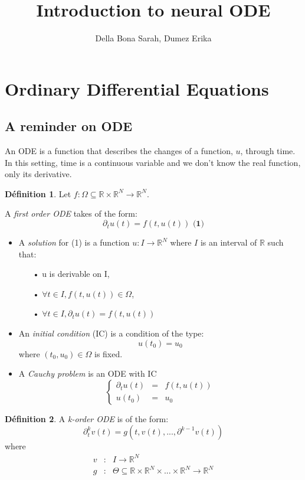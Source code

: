 \documentclass[10pt,a4paper]{article}
\author{Della Bona Sarah, Dumez Erika}
\title{Introduction to neural ODE}
\theoremstyle{definition}
\newtheorem{definition}{Définition}
\theoremstyle{definition}
\begin{document}
\maketitle
\tableofcontents
 
\section{Ordinary Differential Equations}

\subsection{A reminder on ODE}

An ODE is a function that describes the changes of a function, $u$, through time. In this setting, time is a continuous variable and we don't know the real function, only its derivative.

\begin{definition}
Let $f: \Omega \subseteq \mathbb{R} \times \mathbb{R}^N \rightarrow \mathbb{R}^N$. 

A \textit{first order ODE} takes of the form:
\[
\partial_t u(t) = f(t,u(t)) \textbf{   (1)}
\]

\begin{itemize}
\item A \textit{solution} for (1) is a function $u : I \rightarrow \mathbb{R}^N$ where $I$ is an interval of $\mathbb{R}$ such that:
	\begin{itemize}
	\item[•] u is derivable on I,
	\item[•] $\forall t \in I, f(t, u(t)) \in \Omega$,
	\item[•] $\forall t \in I, \partial_t u(t) = f(t, u(t))$
	\end{itemize}
\item An \textit{initial condition} (IC) is a condition of the type:
\[
u(t_0) = u_0
\]
where $(t_0, u_0) \in \Omega$ is fixed.

\item A \textit{Cauchy problem} is an ODE with IC
\[
\left \{
\begin{array}{rcl}
\partial_t u(t) & = & f(t, u(t)) \\
u(t_0) & = & u_0
\end{array}
\right.
\]
\end{itemize}
\end{definition}

\begin{definition}
A \textit{k-order ODE} is of the form:
\[
\partial^k_t v(t) = g(t, v(t), ... , \partial^{k-1}v(t))
\]
where 
   \begin{eqnarray}
   \nonumber
   v & : & I \rightarrow \mathbb{R}^N \\ 
   \nonumber
   g & : & \Theta \subseteq \mathbb{R} \times \mathbb{R}^N \times ... \times \mathbb{R}^N \rightarrow \mathbb{R}^N
   \end{eqnarray}
\end{definition}
\end{document}
